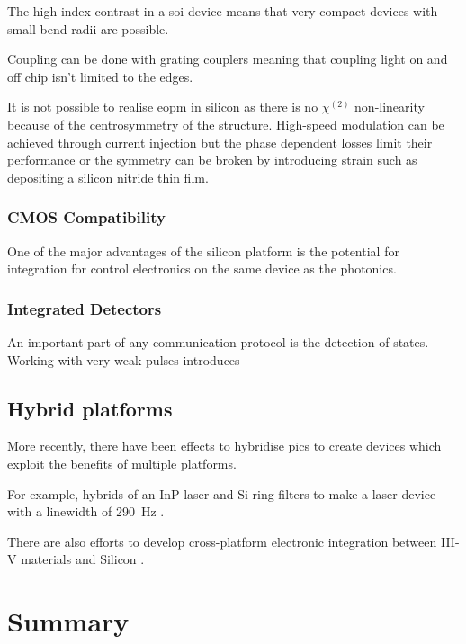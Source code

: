 The high index contrast in a \ac{soi} device means that very compact devices with small bend radii are possible.

Coupling can be done with grating couplers meaning that coupling light on and off chip isn't limited to the edges.

It is not possible to realise \ac{eopm} in silicon as there is no $\chi^{(2)}$ non-linearity because of the centrosymmetry of the structure. High-speed modulation can be achieved through current injection but the phase dependent losses limit their performance \cite{} or the symmetry can be broken by introducing strain such as depositing a silicon nitride thin film.

\subsubsection*{CMOS Compatibility}

One of the major advantages of the silicon platform is the potential for integration for control electronics on the same device as the photonics.

\subsubsection*{Integrated Detectors}

An important part of any communication protocol is the detection of states. Working with very weak pulses introduces 

\subsection{Hybrid platforms}

More recently, there have been effects to hybridise \acp{pic} to create devices which exploit the benefits of multiple platforms. 

For example, hybrids of an \ac{InP} laser and Si ring filters to make a laser device with a linewidth of \SI{290}{Hz} \cite{Fan2017}.

There are also efforts to develop cross-platform electronic integration between III-V materials and Silicon \cite{}. 

\section{Summary}


